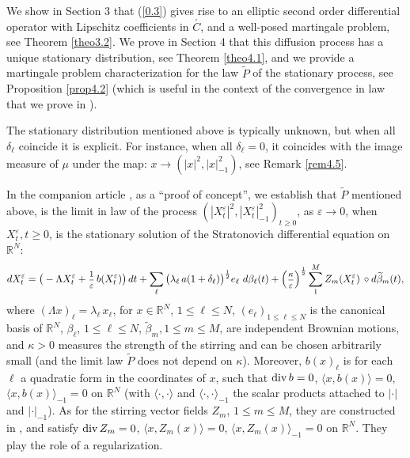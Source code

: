 \documentclass[12pt,leqno]{article}
\def\IR{{\mathbb R}}
\def\n{\noindent}
\def\dis{\displaystyle}
\def\ve{\varepsilon}
\def\f{\footnotesize}
\def\wt{\widetilde}
\begin{document}
\n
We show in Section 3 that (\ref{0.3}) gives rise to an elliptic second order differential operator with Lipschitz coefficients in $\stackrel{_\circ}{C}$, and a well-posed martingale problem, see Theorem \ref{theo3.2}. We prove in Section 4 that this diffusion process has a unique stationary distribution, see Theorem \ref{theo4.1}, and we provide a martingale problem characterization for the law $\wt{P}$ of the stationary process, see Proposition \ref{prop4.2} (which is useful in the context of the convergence in law that we prove in \cite{SzniWidm26b}).

\medskip
The stationary distribution mentioned above is typically unknown, but when all $\delta_\ell$ coincide it is explicit. For instance, when all $\delta_\ell = 0$, it coincides with the image measure of $\mu$ under the map: $x \longrightarrow (|x|^2, |x|^2_{-1})$, see Remark \ref{rem4.5}.

\medskip
In the companion article \cite{SzniWidm26b}, as a ``proof of concept'', we establish that $\wt{P}$ mentioned above, is the limit in law of the process $(|X^\ve_t |^2, |X^\ve_t|^2_{-1})_{t \ge 0}$, as $\ve \rightarrow 0$, when $X^\ve_t, t \ge 0$, is the stationary solution of the Stratonovich differential equation on $\IR^N$:
\begin{equation}\label{0.4}
dX^\ve_t = \big( -\Lambda X^\ve_t + \mbox{\f $\dis\frac{1}{\ve}$} \, b(X^\ve_t)\big) \,dt + \dis\sum_\ell \big(\lambda_\ell \, a(1 + \delta_\ell)\big)^{\frac{1}{2}} e_\ell \,\, d \beta_\ell(t) + \Big(\mbox{\f $\dis\frac{\kappa}{\ve}$} \Big)^{\frac{1}{2}} \dis\sum^M_1 Z_m(X^\ve_t) \, \circ d \wt{\beta}_m(t),
\end{equation}
where $(\Lambda x)_\ell = \lambda_\ell \, x_\ell$, for $x \in \IR^N$, $1 \le \ell \le N$, $(e_\ell)_{1 \le \ell \le N}$ is the canonical basis of $\IR^N$, $\beta_\ell$, $1 \le \ell \le N$, $\wt{\beta}_m, 1 \le m \le M$, are independent Brownian motions, and $\kappa > 0$ measures the strength of the stirring and can be chosen arbitrarily small (and the limit law $\wt{P}$ does not depend on $\kappa$). Moreover, $b(x)_\ell$ is for each $\ell$ a quadratic form in the coordinates of $x$, such that ${\rm div} \, b = 0$, $\langle x, b(x) \rangle = 0$, $\langle x, b(x)\rangle_{-1} = 0$ on $\IR^N$ (with $\langle \cdot, \cdot \rangle$ and $\langle \cdot, \cdot \rangle_{-1}$ the scalar products attached to $| \cdot |$ and $| \cdot |_{-1}$). As for the stirring vector fields $Z_m$, $1 \le m \le M$, they are constructed in \cite{SzniWidm26b}, and satisfy ${\rm div} \,Z_m = 0$, $\langle x, Z_m(x)\rangle = 0$, $\langle x, Z_m(x)\rangle_{-1} = 0$ on $\IR^N$. They play the role of a regularization. 
\end{document}
